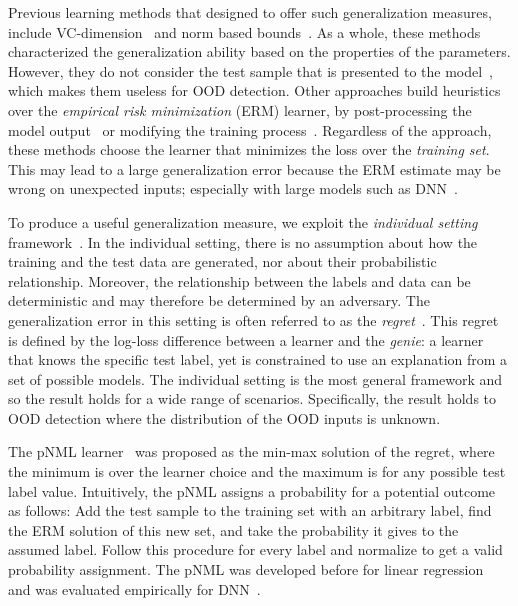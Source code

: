 \documentclass{article}
\begin{document}
Previous learning methods that designed to offer such generalization measures, include VC-dimension~\citep{zhong2017recovery,vapnik2015uniform} and norm based bounds~\citep{DBLP:conf/iclr/NeyshaburBS18,DBLP:conf/nips/BartlettFT17}. As a whole, these methods characterized the generalization ability based on the properties of the parameters. However, they do not consider the test sample that is presented to the model~\citep{DBLP:conf/iclr/JiangNMKB20}, which makes them useless for OOD detection.
Other approaches build heuristics over the \textit{empirical risk minimization} (ERM) learner, by post-processing the model output~\citep{gram} or modifying the training process~\citep{PAPADOPOULOS2021138,vyas2018out}. Regardless of the approach, these methods choose the learner that minimizes the loss over the \textit{training set}. This may lead to a large generalization error because the ERM estimate may be wrong on unexpected inputs; especially with large models such as DNN~\citep{belkin2019reconciling}.

To produce a useful generalization measure, we exploit the \textit{individual setting} framework~\citep{merhav1998universal}. 
In the individual setting, there is no assumption about how the training and the test data are generated, nor about their probabilistic relationship.
Moreover, the relationship between the labels and data can be deterministic and may therefore be determined by an adversary.
The generalization error in this setting is often referred to as the \textit{regret}~\citep{merhav1998universal}.
This regret is defined by the log-loss difference between a learner and the \textit{genie}: a learner that knows the specific test label, yet is constrained to use an explanation from a set of possible models.
The individual setting is the most general framework and so the result holds for a wide range of scenarios. Specifically, the result holds to OOD detection where the distribution of the OOD inputs is unknown.

The pNML learner~\citep{fogel2018universal} was proposed as the min-max solution of the regret, where the minimum is over the learner choice and the maximum is for any possible test label value.
Intuitively, the pNML assigns a probability for a potential outcome as follows: Add the test sample to the training set with an arbitrary label, find the ERM solution of this new set, and take the probability it gives to the assumed label. 
Follow this procedure for every label and normalize to get a valid probability assignment.
The pNML was developed before for linear regression~\citep{bibas2019new} and was evaluated empirically for DNN~\citep{fu2021offline,bibas2019deep}.
\end{document}
